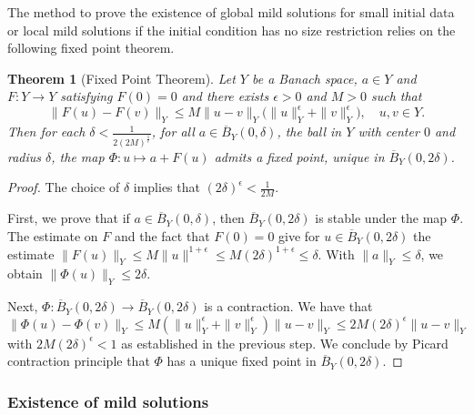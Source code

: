 \documentclass[a4paper, 12pt]{article}
\theoremstyle{plain}
\newtheorem{theorem}[proposition]{Theorem}
\theoremstyle{definition}
\theoremstyle{remark}
\numberwithin{equation}{section}
\begin{document}
The method to prove the existence of global mild solutions for small initial data or local mild solutions if the initial condition has no
size restriction relies on the following fixed point theorem.

\begin{theorem}[Fixed Point Theorem]
\label{thm:picard}
Let $Y$ be a Banach space, $a\in Y$ and $F:Y\to Y$ satisfying $F(0)=0$ and there exists $\epsilon>0$ and $M>0$ such
that 
%
\begin{equation}
\label{eq:estPicard}
\|F(u)-F(v)\|_Y\le M\|u-v\|_Y\bigl(\|u\|_Y^\epsilon+\|v\|_Y^\epsilon\bigr), \quad u,v\in Y.
\end{equation}
%
Then for each $\delta <\frac{1}{2(2M)^{\frac{1}{\epsilon}}}$, for all $a\in\overline{B}_Y(0,\delta)$, the ball in $Y$ with center $0$ and
radius $\delta$, the map $\Phi:u\mapsto a+F(u)$ admits a fixed point, unique in $\overline{B}_Y(0,2\delta)$.
\end{theorem}

\begin{proof}
The choice of $\delta$ implies that $(2\delta)^\epsilon<\frac{1}{2M}$.

\noindent
First, we prove that if $a\in \overline{B}_Y(0,\delta)$, then $\overline{B}_Y(0,2\delta)$ is stable under the map $\Phi$.  
The estimate on $F$ and the fact that $F(0)=0$ give for $u\in \overline{B}_Y(0,2\delta)$ the estimate
$\|F(u)\|_Y\le M\|u\|^{1+\epsilon}\le M (2\delta)^{1+\epsilon}\le \delta$. With $\|a\|_Y\le \delta$, we
obtain $\|\Phi(u)\|_Y\le 2\delta$.

\noindent
Next, $\Phi:\overline{B}_Y(0,2\delta)\to \overline{B}_Y(0,2\delta)$ is a contraction. We have that
\[
\|\Phi(u)-\Phi(v)\|_Y\le M(\|u\|_Y^\epsilon+\|v\|_Y^\epsilon)\|u-v\|_Y\le 2M(2\delta)^\epsilon\|u-v\|_Y
\] 
with $2M(2\delta)^\epsilon<1$ as established in the previous step.
We conclude by Picard contraction principle that $\Phi$ has a unique fixed point in $\overline{B}_Y(0,2\delta)$.
\end{proof}

\subsubsection{Existence of mild solutions}
\end{document}
